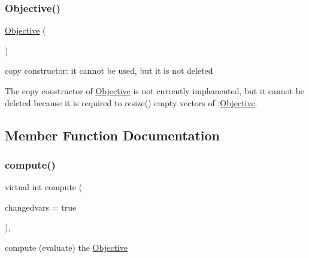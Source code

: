 \subsubsection{\texorpdfstring{Objective()}{Objective()}\hspace{0.1cm}{\footnotesize\ttfamily [2/2]}}
{\footnotesize\ttfamily \mbox{\hyperlink{class_s_m_spp__di__unipi__it_1_1_objective}{Objective}} (\begin{DoxyParamCaption}\item[{const \mbox{\hyperlink{class_s_m_spp__di__unipi__it_1_1_objective}{Objective}} \&}]{ }\end{DoxyParamCaption})\hspace{0.3cm}{\ttfamily [inline]}}



copy constructor\+: it cannot be used, but it is not deleted 

The copy constructor of \mbox{\hyperlink{class_s_m_spp__di__unipi__it_1_1_objective}{Objective}} is not currently implemented, but it cannot be deleted because it is required to resize() empty vectors of \+:\mbox{\hyperlink{class_s_m_spp__di__unipi__it_1_1_objective}{Objective}}. 

\subsection{Member Function Documentation}
\mbox{\label{class_s_m_spp__di__unipi__it_1_1_objective_a504d4e3e174c7a518cc66156a8a45ce5}} 
\subsubsection{\texorpdfstring{compute()}{compute()}}
{\footnotesize\ttfamily virtual int compute (\begin{DoxyParamCaption}\item[{bool}]{changedvars = {\ttfamily true} }\end{DoxyParamCaption})\hspace{0.3cm}{\ttfamily [override]}, {}}



compute (evaluate) the \mbox{\hyperlink{class_s_m_spp__di__unipi__it_1_1_objective}{Objective}} 

